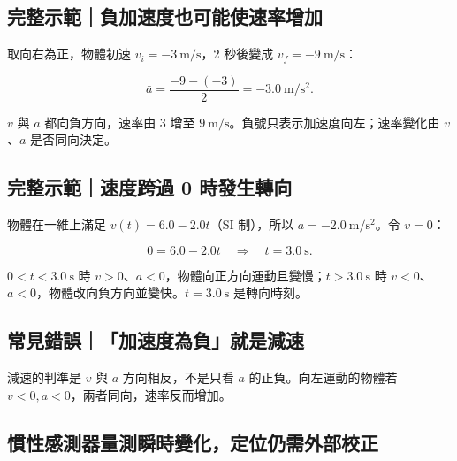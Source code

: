 \documentclass[11pt,a4paper]{article}
\begin{document}
\begin{HandoutWorkedExample}

\subsection{完整示範｜負加速度也可能使速率增加}\label{ux5b8cux6574ux793aux7bc4ux8ca0ux52a0ux901fux5ea6ux4e5fux53efux80fdux4f7fux901fux7387ux589eux52a0}

取向右為正，物體初速 \(v_i=-3\ \mathrm{m/s}\)，2 秒後變成 \(v_f=-9\ \mathrm{m/s}\)：

\[
\bar a=\frac{-9-(-3)}{2}=-3.0\ \mathrm{m/s^2}.
\]

\(v\) 與 \(a\) 都向負方向，速率由 \(3\) 增至 \(9\ \mathrm{m/s}\)。負號只表示加速度向左；速率變化由 \(v\)、\(a\) 是否同向決定。

\end{HandoutWorkedExample}

\begin{HandoutWorkedExample}

\subsection{完整示範｜速度跨過 0 時發生轉向}\label{ux5b8cux6574ux793aux7bc4ux901fux5ea6ux8de8ux904e-0-ux6642ux767cux751fux8f49ux5411}

物體在一維上滿足 \(v(t)=6.0-2.0t\)（SI 制），所以 \(a=-2.0\ \mathrm{m/s^2}\)。令 \(v=0\)：

\[
0=6.0-2.0t\quad\Rightarrow\quad t=3.0\ \mathrm s.
\]

\(0<t<3.0\ \mathrm s\) 時 \(v>0\)、\(a<0\)，物體向正方向運動且變慢；\(t>3.0\ \mathrm s\) 時 \(v<0\)、\(a<0\)，物體改向負方向並變快。\(t=3.0\ \mathrm s\) 是轉向時刻。

\end{HandoutWorkedExample}

\subsection{常見錯誤｜「加速度為負」就是減速}\label{ux5e38ux898bux932fux8aa4ux52a0ux901fux5ea6ux70baux8ca0ux5c31ux662fux6e1bux901f}

減速的判準是 \(v\) 與 \(a\) 方向相反，不是只看 \(a\) 的正負。向左運動的物體若 \(v<0,a<0\)，兩者同向，速率反而增加。

\subsection{慣性感測器量測瞬時變化，定位仍需外部校正}\label{ux6163ux6027ux611fux6e2cux5668ux91cfux6e2cux77acux6642ux8b8aux5316ux5b9aux4f4dux4ecdux9700ux5916ux90e8ux6821ux6b63}
\end{document}
